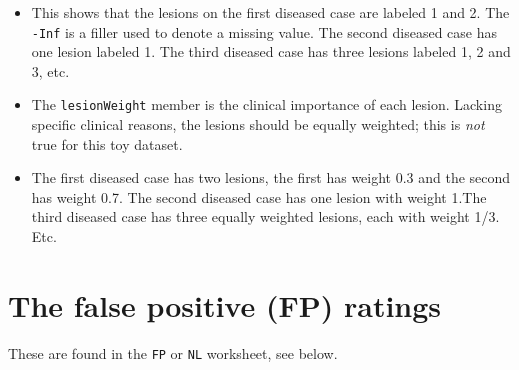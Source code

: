 \documentclass[
]{book}
\newenvironment{Shaded}{\begin{snugshade}}{\end{snugshade}}
\newcommand{\CommentTok}[1]{\textcolor[rgb]{0.56,0.35,0.01}{\textit{#1}}}
\newcommand{\NormalTok}[1]{#1}
\newcommand{\OperatorTok}[1]{\textcolor[rgb]{0.81,0.36,0.00}{\textbf{#1}}}
\providecommand{\tightlist}{%
  \setlength{\itemsep}{0pt}\setlength{\parskip}{0pt}}
\begin{document}
\begin{Shaded}
\end{Shaded}

\begin{itemize}
\tightlist
\item
  This shows that the lesions on the first diseased case are labeled 1 and 2. The \texttt{-Inf} is a filler used to denote a missing value. The second diseased case has one lesion labeled 1. The third diseased case has three lesions labeled 1, 2 and 3, etc.
\item
  The \texttt{lesionWeight} member is the clinical importance of each lesion. Lacking specific clinical reasons, the lesions should be equally weighted; this is \emph{not} true for this toy dataset.
\end{itemize}

\begin{Shaded}
\end{Shaded}

\begin{itemize}
\tightlist
\item
  The first diseased case has two lesions, the first has weight 0.3 and the second has weight 0.7. The second diseased case has one lesion with weight 1.The third diseased case has three equally weighted lesions, each with weight 1/3. Etc.
\end{itemize}

\hypertarget{the-false-positive-fp-ratings}{%
\section{The false positive (FP) ratings}\label{the-false-positive-fp-ratings}}

These are found in the \texttt{FP} or \texttt{NL} worksheet, see below.
\end{document}
